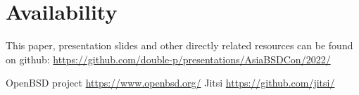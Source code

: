 \documentclass[conference]{IEEEtran}
\begin{document}
\section{Availability}
This paper, presentation slides and other directly related resources can be found on github:
\url{https://github.com/double-p/presentations/AsiaBSDCon/2022/}


\begin{thebibliography}{00}
 OpenBSD project \url{https://www.openbsd.org/}
 Jitsi \url{https://github.com/jitsi/}

\end{thebibliography}
\end{document}
